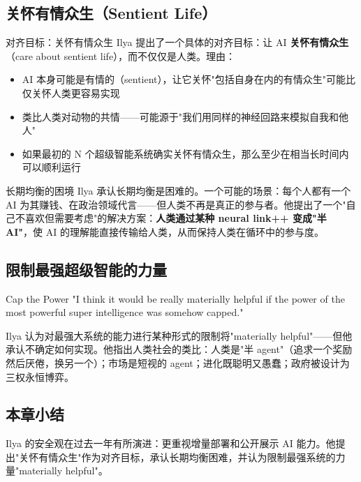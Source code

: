 \documentclass[a4paper]{article}
\begin{document}
\subsection{关怀有情众生（Sentient Life）}

\begin{importantbox}{对齐目标：关怀有情众生}
Ilya 提出了一个具体的对齐目标：让 AI \textbf{关怀有情众生}（care about sentient life），而不仅仅是人类。理由：
\begin{itemize}
    \item AI 本身可能是有情的（sentient），让它关怀"包括自身在内的有情众生"可能比仅关怀人类更容易实现
    \item 类比人类对动物的共情——可能源于"我们用同样的神经回路来模拟自我和他人"
    \item 如果最初的 N 个超级智能系统确实关怀有情众生，那么至少在相当长时间内可以顺利运行
\end{itemize}
\end{importantbox}

\begin{warningbox}{长期均衡的困境}
Ilya 承认长期均衡是困难的。一个可能的场景：每个人都有一个 AI 为其赚钱、在政治领域代言——但人类不再是真正的参与者。他提出了一个"自己不喜欢但需要考虑"的解决方案：\textbf{人类通过某种 neural link++ 变成"半 AI"}，使 AI 的理解能直接传输给人类，从而保持人类在循环中的参与度。
\end{warningbox}

\subsection{限制最强超级智能的力量}

\begin{importantbox}{Cap the Power}
"I think it would be really materially helpful if the power of the most powerful super intelligence was somehow capped."

Ilya 认为对最强大系统的能力进行某种形式的限制将"materially helpful"——但他承认不确定如何实现。他指出人类社会的类比：人类是"半 agent"（追求一个奖励然后厌倦，换另一个）；市场是短视的 agent；进化既聪明又愚蠢；政府被设计为三权永恒博弈。
\end{importantbox}

\subsection{本章小结}

Ilya 的安全观在过去一年有所演进：更重视增量部署和公开展示 AI 能力。他提出"关怀有情众生"作为对齐目标，承认长期均衡困难，并认为限制最强系统的力量"materially helpful"。
\end{document}
